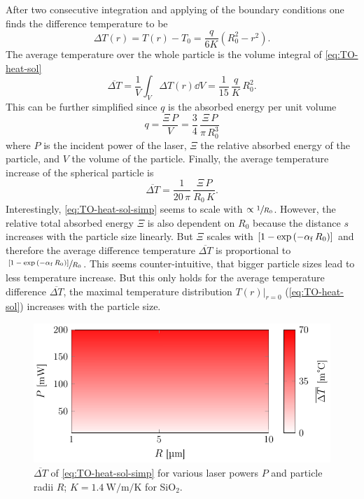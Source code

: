 After two consecutive integration and applying of the boundary conditions one 
finds the difference temperature to be
\begin{equation}
  \Delta T(r) = T(r) - T_{0} = \frac{q}{6K}\left( R_0^2 - r^{2} \right).
  \label{eq:TO-heat-sol}
\end{equation}
The average temperature over the whole particle is the volume integral of 
\cref{eq:TO-heat-sol}
\begin{equation}
  \overline{\Delta T} = \frac{1}{V}\int_{V}\Delta T(r) \dd{V} = 
  \frac{1}{15}\,\frac{q}{K}\,R^{2}_{0}.
  \label{eq:TO-heat-avg}
\end{equation}
This can be further simplified since $q$ is the absorbed energy per unit volume
\begin{equation}
  q = \frac{\Xi\,P}{V} = \frac{3}{4}\,\frac{\Xi\,P}{\pi\,R_{0}^{3}}
\end{equation}
where $P$ is the incident power of the laser, $\Xi$ the relative absorbed 
energy of the particle, and $V$ the volume of the particle. Finally, the 
average temperature increase of the spherical particle is
\begin{equation}
  \overline{\Delta T} = \frac{1}{20\,\pi}\,\frac{\Xi\,P}{R_{0}\,K}.
  \label{eq:TO-heat-sol-simp}
\end{equation}
Interestingly, \cref{eq:TO-heat-sol-simp} seems to scale with $\propto 
\sfrac{1}{R_{0}}$. However, the relative total absorbed energy $\Xi$ is also 
dependent on $R_{0}$ because the distance $s$ increases with the particle size 
linearly. But $\Xi$ scales with $\left[  1-\exp\left( -\alpha_{\mathrm{f}}\,R_{0} 
\right)\right]$ and therefore the average difference temperature 
$\overline{\Delta T}$ is proportional to $\sfrac{\left[ 1-\exp\left( 
-\alpha_{\mathrm{f}}\,R_{0} \right) \right]}{R_{0}}$. This seems counter-intuitive, 
that bigger particle sizes lead to less temperature increase. But this only 
holds for the average temperature difference $\overline{\Delta T}$, the maximal 
temperature distribution $T(r)\vert_{r=0}$ (\cref{eq:TO-heat-sol}) increases 
with the particle size.

\begin{figure}[tbp]
  \centering
  \includegraphics[]{Plots/cache/dT.pdf}
  \caption{$\overline{\Delta T}$ of \cref{eq:TO-heat-sol-simp} for various 
  laser powers $P$ and particle radii $R$; 
$K=\SI{1.4}{\watt\per\meter\per\kelvin}$ for SiO$_{2}$.}
  \label{fig:TO-dT}
\end{figure}

